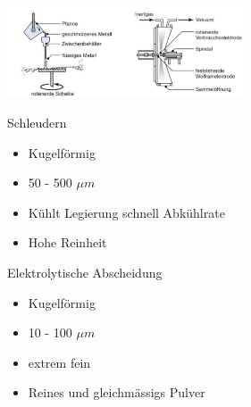 \includegraphics[width = 70mm]{src/images/Schleudern:Elektrolytisch.png}
\begin{minipage}{0.5\linewidth}
    Schleudern
    \begin{tiny}
        \begin{itemize}
            \item Kugelförmig
            \item 50 - 500 $\mu m$
            \item Kühlt Legierung schnell Abkühlrate
            \item Hohe Reinheit
        \end{itemize}
    \end{tiny}
\end{minipage}
\begin{minipage}{0.5\linewidth}
    Elektrolytische Abscheidung
    \begin{tiny}
        \begin{itemize}
            \item Kugelförmig
            \item 10 - 100 $\mu m$
            \item extrem fein
            \item Reines und gleichmässigs Pulver
        \end{itemize}
    \end{tiny}
\end{minipage}



